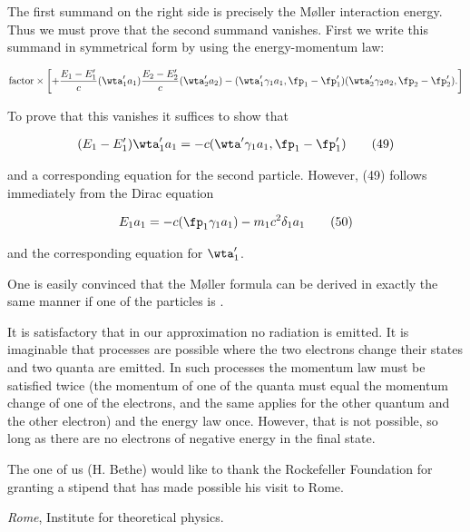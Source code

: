 \documentclass{article}
\newcommand{\nequ}[2]{
\begin{align*}
#1
\tag{#2}
\end{align*}
}
\newcommand{\uequ}[1]{
\begin{align*}
#1
\end{align*}
}
\begin{document}
The first summand on the right side is precisely the Møller interaction energy. Thus we must prove that the second summand vanishes. First we write this summand in symmetrical form by using the energy-momentum law:
\uequ{
\text{factor}\times\left[
+\frac{E_1-E'_1}{c}(\wta'_1 a_1)\frac{E_2-E'_2}{c}(\wta'_2 a_2)
- (\wta'_1 \gamma_1 a_1, \fp_1 - \fp'_1)(\wta'_2 \gamma_2 a_2, \fp_2 - \fp'_2).
\right]
}
To prove that this vanishes it suffices to show that
\nequ{
(E_1 - E'_1)\wta'_1 a_1 = -c(\wta' \gamma_1 a_1, \fp_1 - \fp'_1)
}{49}
and a corresponding equation for the second particle. However, (49) follows immediately from the Dirac equation
\nequ{
E_1 a_1 = -c(\fp_1 \gamma_1 a_1) - m_1 c^2 \delta_1 a_1
}{50}
and the corresponding equation for $\wta'_1$.

One is easily convinced that the Møller formula can be derived in exactly the same manner if one of the particles is .

It is satisfactory that in our approximation no radiation is emitted. It is imaginable that processes are possible where the two electrons change their states and two quanta are emitted. In such processes the momentum law must be satisfied twice (the momentum of one of the quanta must equal the momentum change of one of the electrons, and the same applies for the other quantum and the other electron) and the energy law once. However, that is not possible, so long as there are no electrons of negative energy in the final state.

The one of us (H. Bethe) would like to thank the Rockefeller Foundation for granting a stipend that has made possible his visit to Rome.

\textit{Rome}, Institute for theoretical physics.


 
\end{document}
